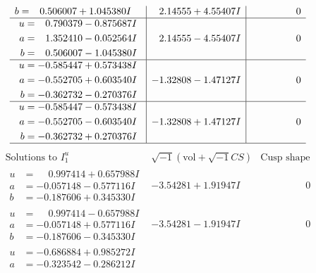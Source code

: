 \documentclass[1p]{elsarticle_modified}
\theoremstyle{definition}
\newcommand{\I}{\sqrt{-1}}
\begin{document}
$$\begin{array}{c|c|c}
\begin{aligned}
b &= \phantom{-}0.506007 + 1.045380 I\end{aligned}
 & \phantom{-}2.14555 + 4.55407 I & \phantom{-0.000000 } 0 \\ \hline\begin{aligned}
u &= \phantom{-}0.790379 - 0.875687 I \\
a &= \phantom{-}1.352410 - 0.052564 I \\
b &= \phantom{-}0.506007 - 1.045380 I\end{aligned}
 & \phantom{-}2.14555 - 4.55407 I & \phantom{-0.000000 } 0 \\ \hline\begin{aligned}
u &= -0.585447 + 0.573438 I \\
a &= -0.552705 + 0.603540 I \\
b &= -0.362732 - 0.270376 I\end{aligned}
 & -1.32808 - 1.47127 I & \phantom{-0.000000 } 0 \\ \hline\begin{aligned}
u &= -0.585447 - 0.573438 I \\
a &= -0.552705 - 0.603540 I \\
b &= -0.362732 + 0.270376 I\end{aligned}
 & -1.32808 + 1.47127 I & \phantom{-0.000000 } 0\\
 \hline 
 \end{array}$$\newpage$$\begin{array}{c|c|c}  
\text{Solutions to }I^u_{1}& \I (\text{vol} + \sqrt{-1}CS) & \text{Cusp shape}\\
 \hline 
\begin{aligned}
u &= \phantom{-}0.997414 + 0.657988 I \\
a &= -0.057148 - 0.577116 I \\
b &= -0.187606 + 0.345330 I\end{aligned}
 & -3.54281 + 1.91947 I & \phantom{-0.000000 } 0 \\ \hline\begin{aligned}
u &= \phantom{-}0.997414 - 0.657988 I \\
a &= -0.057148 + 0.577116 I \\
b &= -0.187606 - 0.345330 I\end{aligned}
 & -3.54281 - 1.91947 I & \phantom{-0.000000 } 0 \\ \hline\begin{aligned}
u &= -0.686884 + 0.985272 I \\
a &= -0.323542 - 0.286212 I \\

\end{aligned}
\end{array}$$
\end{document}
